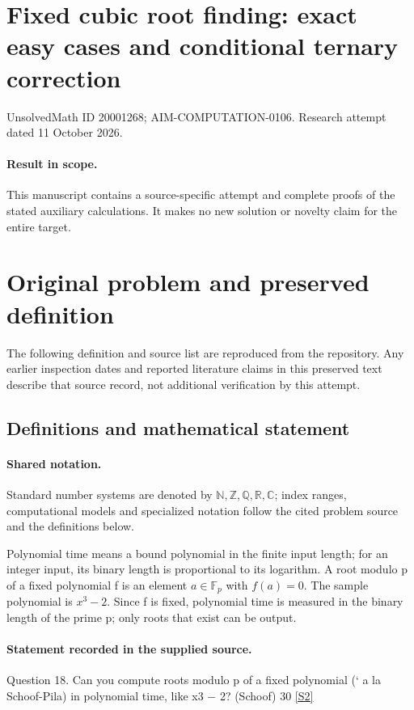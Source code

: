 \documentclass[11pt]{article}
\begin{document}
\section*{Fixed cubic root finding: exact easy cases and conditional ternary correction}
\noindent UnsolvedMath ID 20001268; AIM-COMPUTATION-0106. Research attempt dated 11 October 2026.
\paragraph{Result in scope.}This manuscript contains a source-specific attempt and complete proofs of the stated auxiliary calculations. It makes no new solution or novelty claim for the entire target.
\section{Original problem and preserved definition}
The following definition and source list are reproduced from the repository. Any earlier inspection dates and reported literature claims in this preserved text describe that source record, not additional verification by this attempt.
\subsection{Definitions and mathematical statement}

\paragraph{Shared notation.}Standard number systems are denoted by $\mathbb N,\mathbb Z,\mathbb Q,\mathbb R,\mathbb C$; index ranges, computational models and specialized notation follow the cited problem source and the definitions below.


Polynomial time means a bound polynomial in the finite input length; for an integer input, its binary length is proportional to its logarithm. A root modulo p of a fixed polynomial f is an element $a\in\mathbb F_p$ with $f(a)=0$. The sample polynomial is $x^3-2$. Since f is fixed, polynomial time is measured in the binary length of the prime p; only roots that exist can be output.
\paragraph{Statement recorded in the supplied source.}
Question 18. Can you compute roots modulo p of a fixed polynomial (` a la Schoof-Pila) in polynomial time, like x3 − 2? (Schoof) 30 \href{https://aimath.org/WWN/primesinp/primesinp.pdf}{[S2]}
\end{document}
